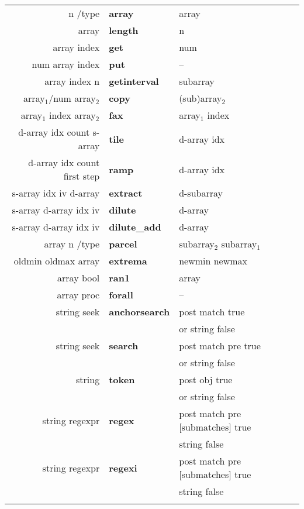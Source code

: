 \begin{supertabular}{>{\sffamily}r>{\sffamily\bfseries}l>{\sffamily}l}
n /type & array & array\\
array & length & n\\
array index & get & num\\
num array index & put & --\\
array index n & getinterval & subarray\\
array$_1$/num array$_2$ & copy & (sub)array$_2$\\
array$_1$ index array$_2$ & fax & array$_1$ index\\
d-array idx count s-array & tile & d-array idx\\
d-array idx count first step & ramp & d-array idx\\
s-array idx iv d-array & extract & d-subarray\\
s-array d-array idx iv & dilute & d-array\\
s-array d-array idx iv &dilute\_add & d-array\\
array n /type  & parcel & subarray$_2$ subarray$_1$\\
oldmin oldmax array & extrema & newmin newmax\\
array bool & ran1 & array\\
array proc & forall & --\\
string seek & anchorsearch & post match true\\
            &              & or string false\\
string seek & search & post match pre true\\
            &        & or string false\\
string & token & post obj true \\
       &       & or string false \\
string regexpr & regex & post match pre [submatches] true\\
               &       & string false\\
string regexpr & regexi & post match pre [submatches] true\\
               &       & string false\\\\
\end{supertabular}



